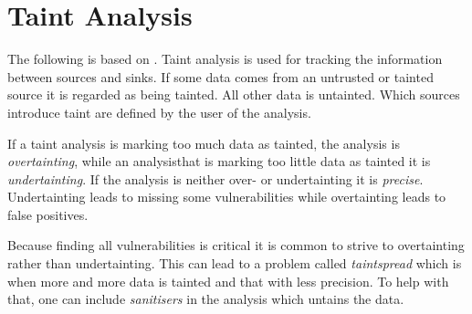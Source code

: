 \section{Taint Analysis}
The following is based on \citet[Part 3]{schwartz2010all}.
Taint analysis is used for tracking the information between sources and sinks.
If some data comes from an untrusted or tainted source it is regarded as being tainted.
All other data is untainted.
Which sources introduce taint are defined by the user of the analysis.

If a taint analysis is marking too much data as tainted, the analysis is \textit{overtainting}, while an analysisthat is marking too little data as tainted it is \textit{undertainting}.
If the analysis is neither over- or undertainting it is \textit{precise}. 
Undertainting leads to missing some vulnerabilities while overtainting leads to false positives.

Because finding all vulnerabilities is critical it is common to strive to overtainting rather than undertainting.
This can lead to a problem called \textit{taintspread} which is when more and more data is tainted and that with less precision.
To help with that, one can include \textit{sanitisers} in the analysis which untains the data.
